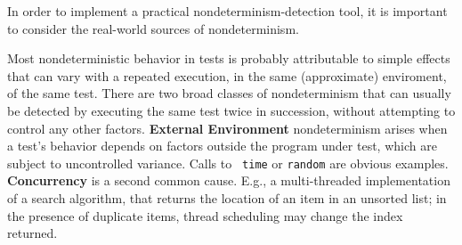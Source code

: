 In order to implement a practical nondeterminism-detection tool, it is
important to consider the real-world sources of nondeterminism.  

Most nondeterministic behavior in tests is probably attributable to simple
effects that can vary with a repeated execution, in the same
(approximate) enviroment, of the same test.  There are two broad classes of
nondeterminism that can usually be detected by
executing the same test twice in succession, without attempting
to control any other factors.  {\bf External Environment} nondeterminism arises
  when a test's behavior depends on factors outside the program under
  test, which are subject to uncontrolled variance.  Calls to {\tt
    time} or {\tt random} are obvious examples.  {\bf Concurrency} is a second common cause.  E.g., a multi-threaded
  implementation of a search algorithm, that returns the location of
  an item in an unsorted list; in the presence of duplicate items,
  thread scheduling may change the index returned.  
